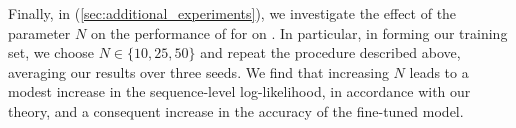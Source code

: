 Finally, in  (\cref{sec:additional_experiments}), we investigate the effect of the parameter $N$ on the performance of \bestofnalg for \phithreefivemini on \mathdataset.  In particular, in forming our training set, we choose $N \in \{10, 25, 50 \}$ and repeat the procedure described above, averaging our results over three seeds.  We find that increasing $N$ leads to a modest increase in the sequence-level log-likelihood, in accordance with our theory, and a consequent increase in the accuracy of the fine-tuned model.


